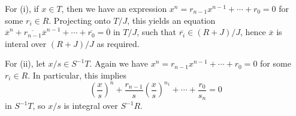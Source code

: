 For (i), if $x \in T$, then we have an expression
$x^n = r_{n-1}x^{n-1}+\cdots + r_0 = 0$ for some $r_i \in R$.
Projecting onto $T/J$, this yields an equation
 $\overline{x}^n + \overline{r_{n-1}}\overline{x}^{n-1} + \cdots + \overline{r_0} = \overline{0}$
 in $T/J$, such that $\overline{r_i} \in (R+J)/J$,
 hence $\overline{x}$ is interal over $(R+J)/J$ as
 required.

 For (ii), let $x/s \in S^{-1}T$. Again we have
$x^n = r_{n-1}x^{n-1}+\cdots + r_0 = 0$ for some $r_i \in R$.
In particular, this implies
\[ \left(\frac{x}{s}\right)^n + \frac{r_{n-1}}{s}\left(\frac{x}{s}\right)^{n_1}+\cdots+\frac{r_0}{s_n} = 0 \]
in $S^{-1}T$, so $x/s$ is integral over $S^{-1}R$.
